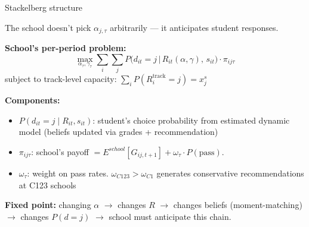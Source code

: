 \documentclass[10pt,aspectratio=169]{beamer}
\begin{document}
\begin{frame}{Stackelberg structure}
\small

The school doesn't pick $\alpha_{j,\tau}$ arbitrarily --- it anticipates student responses.

\bigskip

\textbf{School's per-period problem:}
\[
\max_{\alpha_\tau, \gamma_\tau} \sum_{i} \sum_{j} P\!\big(d_{it} = j \,\big|\, R_{it}(\alpha, \gamma),\, s_{it}\big) \cdot \pi_{ij\tau}
\]
subject to track-level capacity: $\sum_i P(R_i^{\text{track}} = j) = x_j^s$

\bigskip

\textbf{Components:}
\begin{itemize}\setlength\itemsep{3pt}
  \item $P(d_{it} = j \mid R_{it}, s_{it})$: student's choice probability from estimated dynamic model (beliefs updated via grades + recommendation)
  \item $\pi_{ij\tau}$: school's payoff $= E^{school}[G_{ij,t+1}] + \omega_\tau \cdot P(\text{pass})$.
  \item $\omega_\tau$: weight on pass rates. $\omega_{C123} > \omega_{C1}$ generates conservative recommendations at C123 schools
\end{itemize}

\bigskip

\textbf{Fixed point:} changing $\alpha$ $\to$ changes $R$ $\to$ changes beliefs (moment-matching) $\to$ changes $P(d=j)$ $\to$ school must anticipate this chain.

\end{frame}
\end{document}
